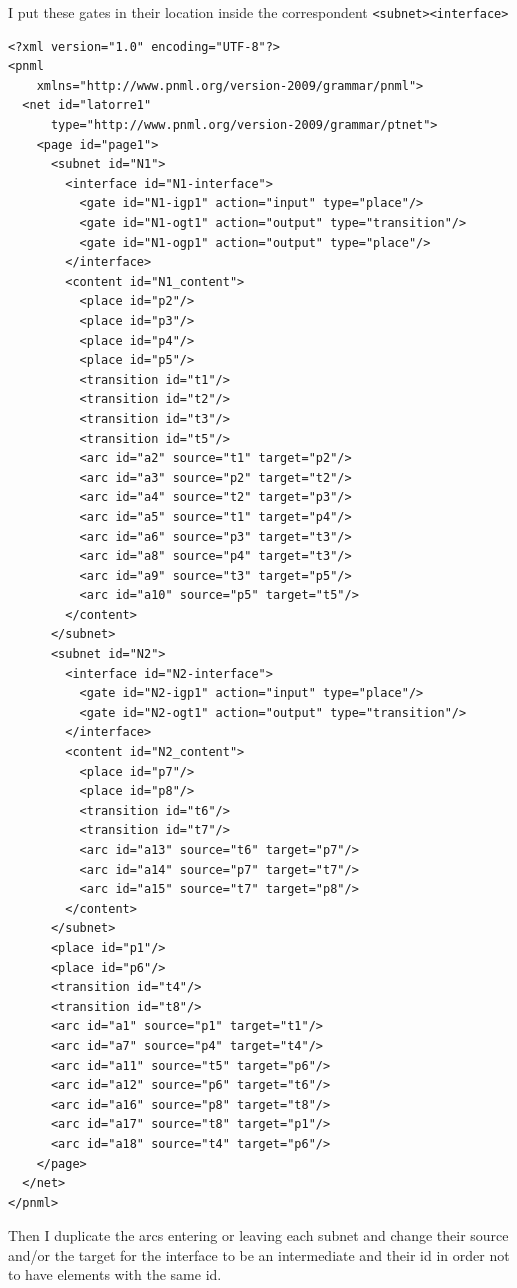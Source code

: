I put these gates in their location inside the correspondent \texttt{<subnet><interface>}

\begin{lstlisting}
<?xml version="1.0" encoding="UTF-8"?>
<pnml
    xmlns="http://www.pnml.org/version-2009/grammar/pnml">
  <net id="latorre1"
      type="http://www.pnml.org/version-2009/grammar/ptnet">
    <page id="page1">
      <subnet id="N1">
        <interface id="N1-interface">
          <gate id="N1-igp1" action="input" type="place"/>
          <gate id="N1-ogt1" action="output" type="transition"/>
          <gate id="N1-ogp1" action="output" type="place"/>
        </interface>
        <content id="N1_content">
          <place id="p2"/>
          <place id="p3"/>
          <place id="p4"/>
          <place id="p5"/>
          <transition id="t1"/>
          <transition id="t2"/>
          <transition id="t3"/>
          <transition id="t5"/>
          <arc id="a2" source="t1" target="p2"/>
          <arc id="a3" source="p2" target="t2"/>
          <arc id="a4" source="t2" target="p3"/>
          <arc id="a5" source="t1" target="p4"/>
          <arc id="a6" source="p3" target="t3"/>
          <arc id="a8" source="p4" target="t3"/>
          <arc id="a9" source="t3" target="p5"/>
          <arc id="a10" source="p5" target="t5"/>
        </content>
      </subnet>
      <subnet id="N2">
        <interface id="N2-interface">
          <gate id="N2-igp1" action="input" type="place"/>
          <gate id="N2-ogt1" action="output" type="transition"/>
        </interface>
        <content id="N2_content">
          <place id="p7"/>
          <place id="p8"/>
          <transition id="t6"/>
          <transition id="t7"/>
          <arc id="a13" source="t6" target="p7"/>
          <arc id="a14" source="p7" target="t7"/>
          <arc id="a15" source="t7" target="p8"/>
        </content>
      </subnet>
      <place id="p1"/>
      <place id="p6"/>
      <transition id="t4"/>
      <transition id="t8"/>
      <arc id="a1" source="p1" target="t1"/>
      <arc id="a7" source="p4" target="t4"/>
      <arc id="a11" source="t5" target="p6"/>
      <arc id="a12" source="p6" target="t6"/>
      <arc id="a16" source="p8" target="t8"/>
      <arc id="a17" source="t8" target="p1"/>
      <arc id="a18" source="t4" target="p6"/>
    </page>
  </net>
</pnml>
\end{lstlisting}

Then I duplicate the arcs entering or leaving each subnet and change their
source and/or the target for the interface to be an intermediate and their
id in order not to have elements with the same id.


